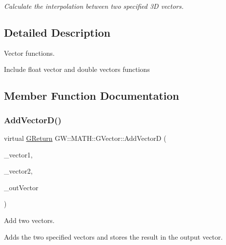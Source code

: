 \begin{DoxyCompactItemize}
\begin{DoxyCompactList}\small\item\em Calculate the interpolation between two specified 3D vectors. \end{DoxyCompactList}\end{DoxyCompactItemize}


\subsection{Detailed Description}
Vector functions. 

Include float vector and double vector\textquotesingle{}s functions 

\subsection{Member Function Documentation}
\mbox{\label{class_g_w_1_1_m_a_t_h_1_1_g_vector_a3c795ce49b0b71dc83528e3b89a1b1ff}} 
\subsubsection{\texorpdfstring{Add\+Vector\+D()}{AddVectorD()}}
{\footnotesize\ttfamily virtual \mbox{\hyperlink{namespace_g_w_a67a839e3df7ea8a5c5686613a7a3de21}{G\+Return}} G\+W\+::\+M\+A\+T\+H\+::\+G\+Vector\+::\+Add\+VectorD (\begin{DoxyParamCaption}\item[{\mbox{\hyperlink{struct_g_w_1_1_m_a_t_h_1_1_g_v_e_c_t_o_r_d}{G\+V\+E\+C\+T\+O\+RD}}}]{\+\_\+vector1,  }\item[{\mbox{\hyperlink{struct_g_w_1_1_m_a_t_h_1_1_g_v_e_c_t_o_r_d}{G\+V\+E\+C\+T\+O\+RD}}}]{\+\_\+vector2,  }\item[{\mbox{\hyperlink{struct_g_w_1_1_m_a_t_h_1_1_g_v_e_c_t_o_r_d}{G\+V\+E\+C\+T\+O\+RD}} \&}]{\+\_\+out\+Vector }\end{DoxyParamCaption})\hspace{0.3cm}{\ttfamily [pure virtual]}}



Add two vectors. 

Adds the two specified vectors and stores the result in the output vector.


